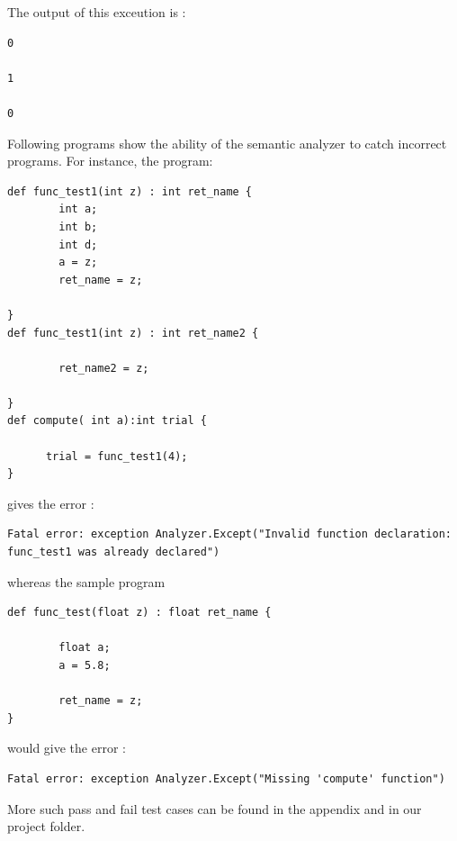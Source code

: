 The output of this exceution is :

\begin{lstlisting}
0

1

0
\end{lstlisting}



Following programs show the ability of the semantic analyzer to catch incorrect programs. For instance, the program:

\begin{lstlisting}
def func_test1(int z) : int ret_name { 
        int a;
        int b;
        int d;
        a = z;
        ret_name = z;

}
def func_test1(int z) : int ret_name2 { 

        ret_name2 = z;

}
def compute( int a):int trial {
      
      trial = func_test1(4);
}

\end{lstlisting}


gives the error :
\begin{lstlisting}
Fatal error: exception Analyzer.Except("Invalid function declaration: func_test1 was already declared")
\end{lstlisting}


whereas the sample program

\begin{lstlisting}
def func_test(float z) : float ret_name { 
        
        float a; 
        a = 5.8;
       
        ret_name = z;  
}
\end{lstlisting}


would give the error :
\begin{lstlisting}
Fatal error: exception Analyzer.Except("Missing 'compute' function")
\end{lstlisting}

More such pass and fail test cases can be found in the appendix and in our project folder.





